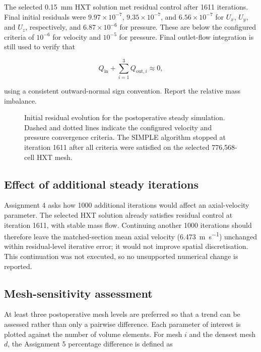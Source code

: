 \documentclass[11pt,a4paper]{article}
\begin{document}
The selected \num{0.15}~mm HXT solution met residual control after 1611
iterations. Final initial residuals were $9.97\times10^{-7}$,
$9.35\times10^{-7}$, and $6.56\times10^{-7}$ for $U_x$, $U_y$, and $U_z$,
respectively, and $6.87\times10^{-6}$ for pressure. These are below the configured criteria of
$10^{-6}$ for velocity and $10^{-5}$ for pressure. Final outlet-flow integration
is still used to verify that

\begin{equation}
  Q_{\mathrm{in}} + \sum_{i=1}^{3} Q_{\mathrm{out},i} \approx 0,
\end{equation}

using a consistent outward-normal sign convention. Report the relative mass
imbalance.

\begin{figure}[htbp]
  \centering
  \resizebox{0.95\textwidth}{!}{}
  \caption{Initial residual evolution for the postoperative steady simulation.
  Dashed and dotted lines indicate the configured velocity and pressure
  convergence criteria. The SIMPLE algorithm stopped at iteration 1611 after all
  criteria were satisfied on the selected 776,568-cell HXT mesh.}
  \label{fig:steady_residuals}
\end{figure}

\subsection{Effect of additional steady iterations}

Assignment 4 asks how 1000 additional iterations would affect an axial-velocity
parameter. The selected HXT solution already satisfies residual control at
iteration 1611, with stable mass flow. Continuing another 1000 iterations should
therefore leave the matched-section mean axial velocity
(\SI{6.473}{\metre\per\second}) unchanged within residual-level iterative error;
it would not improve spatial discretisation. This continuation was not executed,
so no unsupported numerical change is reported.

\subsection{Mesh-sensitivity assessment}
\label{sec:mesh_sensitivity}

At least three postoperative mesh levels are preferred so that a trend can be
assessed rather than only a pairwise difference. Each parameter of interest is
plotted against the number of volume elements. For mesh $i$ and the densest mesh
$d$, the Assignment 5 percentage difference is defined as
\end{document}
